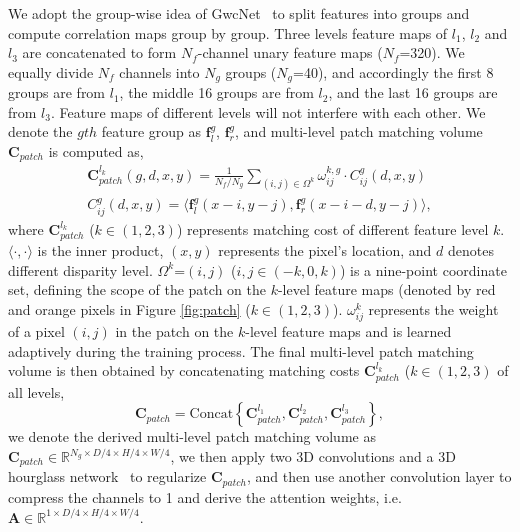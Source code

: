 \documentclass[10pt,twocolumn,letterpaper]{article}
\begin{document}
We adopt the group-wise idea of GwcNet~\cite{guo2019group} to split features into groups and compute correlation maps group by group. Three levels feature maps of $l_1$, $l_2$ and $l_3$ are concatenated to form $N_f$-channel unary feature maps ($N_f$=320). We equally divide $N_f$ channels into $N_g$ groups ($N_g$=40), and accordingly the first 8 groups are from $l_1$, the middle 16 groups are from $l_2$, and the last 16 groups are from $l_3$. Feature maps of different levels will not interfere with each other. We denote the $gth$ feature group as $\mathbf{f}_l^g$, $\mathbf{f}_r^g$, and multi-level patch matching volume $\mathbf{C}_{patch}$ is computed as,
\begin{equation}
\begin{split}
\mathbf{C}_{patch}^{l_{k}}(g,d,x,y)=\frac{1}{N_f/N_g} \sum\limits_{(i,j)\in\Omega^k}\omega_{ij}^{k,g}\cdot C_{ij}^g(d,x,y) \\
C_{ij}^g(d,x,y)=\langle\mathbf{f}_l^g(x\!-\!i,y\!-\!j), \mathbf{f}_{r}^g(x\!-\!i-\!d,y\!-\!j)\rangle,
\end{split}
\end{equation}
where $\mathbf{C}_{patch}^{l_{k}}$ ($k$$\in$$(1,2,3)$) represents matching cost of different feature level $k$. $\langle\cdot,\cdot\rangle$ is the inner product, $(x,y)$ represents the pixel's location, and $d$ denotes different disparity level. $\Omega^k$=$(i,j)$ ($i,j$$\in$$(-k,0,k)$) is a nine-point coordinate set, defining the scope of the patch on the $k$-level feature maps (denoted by red and orange pixels in Figure \ref{fig:patch} ($k$$\in$$(1,2,3)$). $\omega_{ij}^{k}$ represents the weight of a pixel $(i,j)$ in the patch on the $k$-level feature maps and is learned adaptively during the training process. The final multi-level patch matching volume is then obtained by concatenating matching costs $\mathbf{C}_{patch}^{l_k}$ ($k$$\in$$(1,2,3)$ of all levels,
\begin{equation}
\mathbf{C}_{patch}=\text{Concat}\left\{\mathbf{C}_{patch}^{l_1},\mathbf{C}_{patch}^{l_2},\mathbf{C}_{patch}^{l_3}\right\},
\end{equation}
we denote the derived multi-level patch matching volume as $\mathbf{C}_{patch}\in\mathbb{R}^{N_g\times{D}/4\times{H}/4\times{W}/4}$,
we then apply two 3D convolutions and a 3D hourglass network~\cite{guo2019group}
to regularize $\mathbf{C}_{patch}$, and then use another convolution layer to compress the channels to 1 and derive the attention weights, i.e. $\mathbf{A}\in\mathbb{R}^{1\times{D}/4\times{H}/4\times{W}/4}$.
\end{document}
